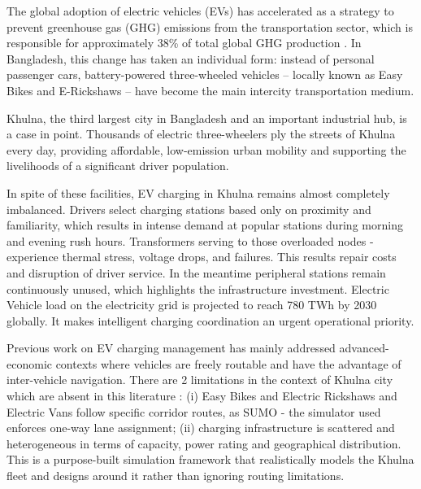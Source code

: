 \documentclass[conference]{IEEEtran}
\begin{document}
The global adoption of electric vehicles (EVs) has accelerated as a
strategy to prevent greenhouse gas (GHG) emissions from the
transportation sector, which is responsible for approximately 38\% of
total global GHG production \cite{b1}. In Bangladesh, this change has
taken an individual form: instead of personal passenger cars,
battery-powered three-wheeled vehicles -- locally known as Easy Bikes
and E-Rickshaws -- have become the main intercity transportation medium.

Khulna, the third largest city in Bangladesh and an important industrial
hub, is a case in point. Thousands of electric three-wheelers ply the
streets of Khulna every day, providing affordable, low-emission urban
mobility and supporting the livelihoods of a significant driver
population.

In spite of these facilities, EV charging in Khulna remains almost
completely imbalanced. Drivers select charging stations based only on
proximity and familiarity, which results in intense demand at popular
stations during morning and evening rush hours. Transformers serving to
those overloaded nodes - experience thermal stress, voltage drops, and
failures. This results repair costs and disruption of driver service. In
the meantime peripheral stations remain continuously unused, which
highlights the infrastructure investment. Electric Vehicle load on the
electricity grid is projected to reach 780 TWh by 2030 \cite{b3}
globally. It makes intelligent charging coordination an urgent
operational priority.

Previous work on EV charging management has mainly addressed
advanced-economic contexts where vehicles are freely routable and have
the advantage of inter-vehicle navigation. There are 2 limitations in
the context of Khulna city which are absent in this literature : (i)
Easy Bikes and Electric Rickshaws and Electric Vans follow specific
corridor routes, as SUMO - the simulator used enforces one-way lane
assignment; (ii) charging infrastructure is scattered and heterogeneous
in terms of capacity, power rating and geographical distribution. This
is a purpose-built simulation framework that realistically models the
Khulna fleet and designs around it rather than ignoring routing
limitations.
\end{document}
